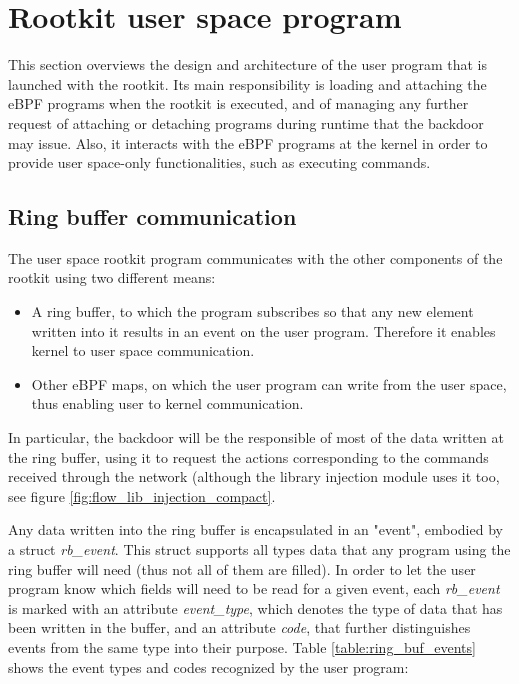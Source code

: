 \section{Rootkit user space program}
This section overviews the design and architecture of the user program that is launched with the rootkit. Its main responsibility is loading and attaching the eBPF programs when the rootkit is executed, and of managing any further request of attaching or detaching programs during runtime that the backdoor may issue. Also, it interacts with the eBPF programs at the kernel in order to provide user space-only functionalities, such as executing commands. 

\subsection{Ring buffer communication}
The user space rootkit program communicates with the other components of the rootkit using two different means:
\begin{itemize}
\item A ring buffer, to which the program subscribes so that any new element written into it results in an event on the user program. Therefore it enables kernel to user space communication.
\item Other eBPF maps, on which the user program can write from the user space, thus enabling user to kernel communication.
\end{itemize}

In particular, the backdoor will be the responsible of most of the data written at the ring buffer, using it to request the actions corresponding to the commands received through the network (although the library injection module uses it too, see figure \ref{fig:flow_lib_injection_compact}. 

Any data written into the ring buffer is encapsulated in an "event", embodied by a struct \textit{rb\_event}. This struct supports all types data that any program using the ring buffer will need (thus not all of them are filled). In order to let the user program know which fields will need to be read for a given event, each \textit{rb\_event} is marked with an attribute \textit{event\_type}, which denotes the type of data that has been written in the buffer, and an attribute \textit{code}, that further distinguishes events from the same type into their purpose. Table \ref{table:ring_buf_events} shows the event types and codes recognized by the user program:

